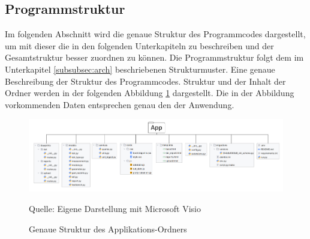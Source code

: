 \subsection{Programmstruktur}
\label{subsec:programmstruktur}


Im folgenden Abschnitt wird die genaue Struktur des Programmcodes dargestellt, um mit dieser die in den folgenden
Unterkapiteln zu beschreiben und der Gesamtstruktur besser zuordnen zu können.
Die Programmstruktur folgt dem im Unterkapitel \ref{subsubsec:arch} beschriebenen Strukturmuster.
Eine genaue Beschreibung der Struktur des Programmcodes.
Struktur und der Inhalt der Ordner werden in der folgenden Abbildung \ref{fig: Genaue Struktur des Applikations-Ordners} dargestellt.
Die in der Abbildung vorkommenden Daten entsprechen genau den der Anwendung.


\begin{figure}[H]
    \centering
    \includegraphics[width=1\textwidth]{Grafiken/Min Ordnerstruktur Projekt.png}
    \caption{Genaue Struktur des Applikations-Ordners}
    \label{fig: Genaue Struktur des Applikations-Ordners}
    {Quelle: Eigene Darstellung mit Microsoft Visio}
\end{figure}